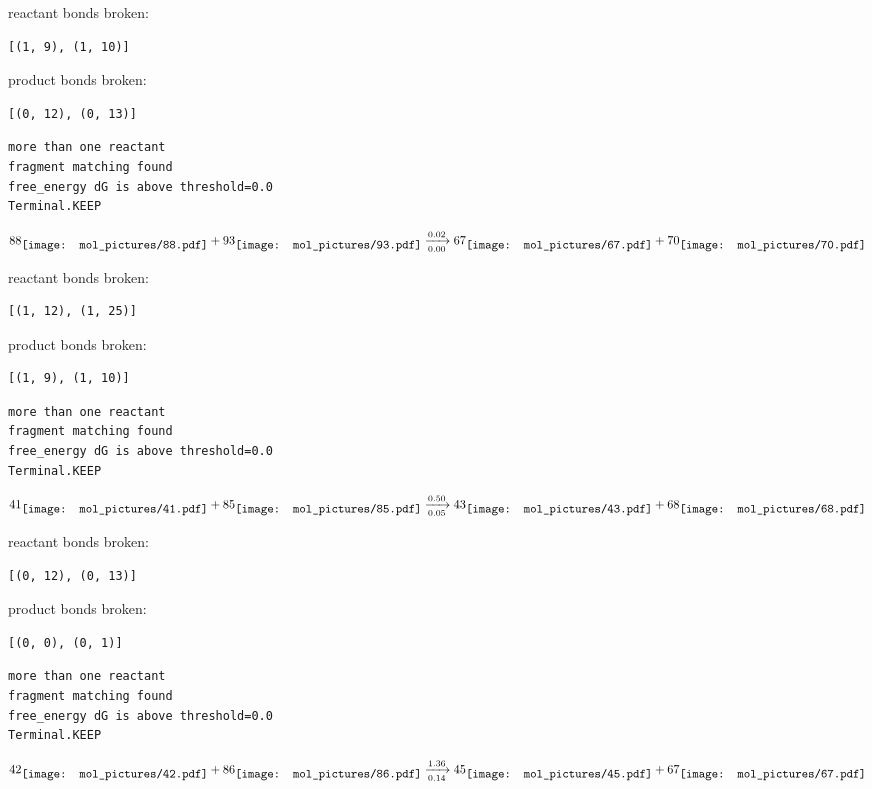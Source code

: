 \documentclass{article}
\begin{document}
reactant bonds broken:\begin{verbatim}
[(1, 9), (1, 10)]
\end{verbatim}
product bonds broken:\begin{verbatim}
[(0, 12), (0, 13)]
\end{verbatim}




\vspace{1cm}
\begin{verbatim}
more than one reactant
fragment matching found
free_energy dG is above threshold=0.0
Terminal.KEEP
\end{verbatim}
$$
88
\raisebox{-.5\height}{\texttt{[image: mol\_pictures/88.pdf]}}
+
93
\raisebox{-.5\height}{\texttt{[image: mol\_pictures/93.pdf]}}
\xrightarrow[0.00]{0.02}
67
\raisebox{-.5\height}{\texttt{[image: mol\_pictures/67.pdf]}}
+
70
\raisebox{-.5\height}{\texttt{[image: mol\_pictures/70.pdf]}}
$$


reactant bonds broken:\begin{verbatim}
[(1, 12), (1, 25)]
\end{verbatim}
product bonds broken:\begin{verbatim}
[(1, 9), (1, 10)]
\end{verbatim}




\vspace{1cm}
\begin{verbatim}
more than one reactant
fragment matching found
free_energy dG is above threshold=0.0
Terminal.KEEP
\end{verbatim}
$$
41
\raisebox{-.5\height}{\texttt{[image: mol\_pictures/41.pdf]}}
+
85
\raisebox{-.5\height}{\texttt{[image: mol\_pictures/85.pdf]}}
\xrightarrow[0.05]{0.50}
43
\raisebox{-.5\height}{\texttt{[image: mol\_pictures/43.pdf]}}
+
68
\raisebox{-.5\height}{\texttt{[image: mol\_pictures/68.pdf]}}
$$


reactant bonds broken:\begin{verbatim}
[(0, 12), (0, 13)]
\end{verbatim}
product bonds broken:\begin{verbatim}
[(0, 0), (0, 1)]
\end{verbatim}




\vspace{1cm}
\begin{verbatim}
more than one reactant
fragment matching found
free_energy dG is above threshold=0.0
Terminal.KEEP
\end{verbatim}
$$
42
\raisebox{-.5\height}{\texttt{[image: mol\_pictures/42.pdf]}}
+
86
\raisebox{-.5\height}{\texttt{[image: mol\_pictures/86.pdf]}}
\xrightarrow[0.14]{1.36}
45
\raisebox{-.5\height}{\texttt{[image: mol\_pictures/45.pdf]}}
+
67
\raisebox{-.5\height}{\texttt{[image: mol\_pictures/67.pdf]}}
$$
\end{document}
